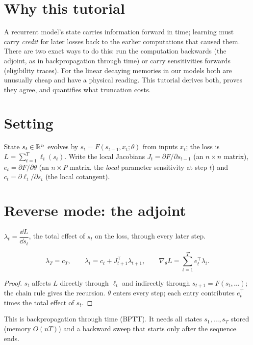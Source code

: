 \documentclass[11pt]{article}
\begin{document}

\section*{Why this tutorial}
A recurrent model's state carries information forward in time; learning must carry \emph{credit} for later losses back to the
earlier computations that caused them. There are two exact ways to do this: run the computation backwards (the adjoint, as in
backpropagation through time) or carry sensitivities forwards (eligibility traces). For the linear decaying memories in our
models both are unusually cheap and have a physical reading. This tutorial derives both, proves they agree, and quantifies
what truncation costs.

\section{Setting}
State $s_t\in\mathbb{R}^n$ evolves by $s_t=F(s_{t-1},x_t;\theta)$ from inputs $x_t$; the loss is $L=\sum_{t=1}^T \ell_t(s_t)$.
Write the local Jacobians $J_t=\partial F/\partial s_{t-1}$ (an $n\times n$ matrix), $e_t=\partial F/\partial\theta$ (an $n\times P$
matrix, the \emph{local} parameter sensitivity at step $t$) and $c_t=\partial\ell_t/\partial s_t$ (the local cotangent).

\section{Reverse mode: the adjoint}
\begin{definition}[Adjoint] $\lambda_t=\dfrac{\dd L}{\dd s_t}$, the total effect of $s_t$ on the loss, through every later step.\end{definition}
\begin{proposition}
\[
\lambda_T=c_T,\qquad \lambda_t=c_t+J_{t+1}^{\top}\lambda_{t+1},\qquad \nabla_\theta L=\sum_{t=1}^T e_t^{\top}\lambda_t .
\]
\end{proposition}
\begin{proof}
$s_t$ affects $L$ directly through $\ell_t$ and indirectly through $s_{t+1}=F(s_t,\dots)$; the chain rule gives the recursion.
$\theta$ enters every step; each entry contributes $e_t^\top$ times the total effect of $s_t$.
\end{proof}
This is backpropagation through time (BPTT). It needs all states $s_1,\dots,s_T$ stored (memory $O(nT)$) and a backward sweep
that starts only after the sequence ends.
\end{document}
